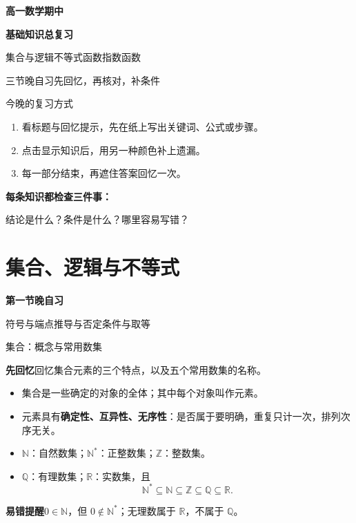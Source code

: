 \documentclass[UTF8,10pt,aspectratio=169]{ctexbeamer}
\newcommand{\Recall}[1]{\par\noindent\textcolor{KnowledgeBlue}{\textbf{先回忆}\quad #1}\par\vspace{0.3cm}}
\newcommand{\Pitfall}[1]{\par\vspace{0.22cm}\noindent\textbf{易错提醒}\quad #1\par}
\newcommand{\Session}[3]{\section{#2}\begin{frame}\vspace{0.7cm}\begin{center}{\Large\bfseries 第#1节晚自习}\par\vspace{0.5cm}{\LARGE\bfseries #2}\par\vspace{0.6cm}#3\end{center}\end{frame}}
\begin{document}
\begin{frame}
\begin{center}
{\LARGE\bfseries 高一数学期中}\par\vspace{0.28cm}
{\LARGE\bfseries 基础知识总复习}\par\vspace{0.55cm}
{\large 集合与逻辑\quad 不等式\quad 函数\quad 指数函数}\par\vspace{0.55cm}
三节晚自习\qquad 先回忆，再核对，补条件
\end{center}
\end{frame}
\begin{frame}[t]{今晚的复习方式}
\begin{enumerate}
\item 看标题与回忆提示，先在纸上写出关键词、公式或步骤。
\item 点击显示知识后，用另一种颜色补上遗漏。
\item 每一部分结束，再遮住答案回忆一次。
\end{enumerate}
\par\vspace{0.5cm}
\textbf{每条知识都检查三件事：}\par\vspace{0.25cm}
结论是什么？\qquad 条件是什么？\qquad 哪里容易写错？
\end{frame}

\Session{一}{集合、逻辑与不等式}{符号与端点\quad 推导与否定\quad 条件与取等}


\begin{frame}[t]{集合：概念与常用数集}
\large
\Recall{回忆集合元素的三个特点，以及五个常用数集的名称。}
\pause
\begin{itemize}
  \item 集合是一些确定的对象的全体；其中每个对象叫作元素。
  \item 元素具有\textbf{确定性、互异性、无序性}：是否属于要明确，重复只计一次，排列次序无关。
  \item $\mathbb N$：自然数集；$\mathbb N^*$：正整数集；$\mathbb Z$：整数集。
  \item $\mathbb Q$：有理数集；$\mathbb R$：实数集，且
  \[\mathbb N^*\subseteq\mathbb N\subseteq\mathbb Z\subseteq\mathbb Q\subseteq\mathbb R.\]
\end{itemize}
\Pitfall{$0\in\mathbb N$，但 $0\notin\mathbb N^*$；无理数属于 $\mathbb R$，不属于 $\mathbb Q$。}
\end{frame}
\end{document}
